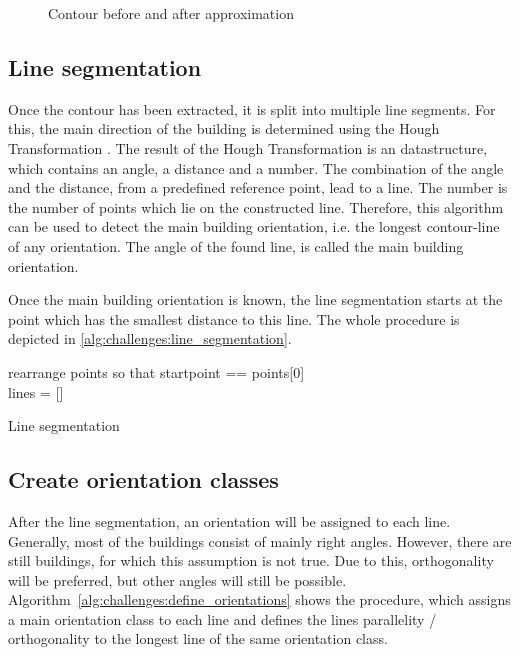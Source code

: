 \begin{figure}[H]
\begin{subfigure}{0.4\textwidth}
	\end{subfigure}
	\caption{Contour before and after approximation}
	\label{fig:challenges:contour_approximation}
\end{figure}


\subsection{Line segmentation}
Once the contour has been extracted, it is split into multiple line segments. For this, the main direction of the building is determined using the Hough Transformation \cite{Duda.1972}. The result of the Hough Transformation is an datastructure, which contains an angle, a distance and a number. The combination of the angle and the distance, from a predefined reference point, lead to a line. The number is the number of points which lie on the constructed line. Therefore, this algorithm can be used to detect the main building orientation, i.e. the longest contour-line of any orientation. The angle of the found line, is called the main building orientation.

Once the main building orientation is known, the line segmentation starts at the point which has the smallest distance to this line. The whole procedure is depicted in \autoref{alg:challenges:line_segmentation}.

\begin{algorithm}[H]
rearrange points so that startpoint == points[0]\\
lines = []\\
\caption{Line segmentation}
\label{alg:challenges:line_segmentation}
\end{algorithm}

\subsection{Create orientation classes}
After the line segmentation, an orientation will be assigned to each line. Generally, most of the buildings consist of mainly right angles. However, there are still buildings, for which this assumption is not true. Due to this, orthogonality will be preferred, but other angles will still be possible. Algorithm~\ref{alg:challenges:define_orientations} shows the procedure, which assigns a main orientation class to each line and defines the lines parallelity / orthogonality to the longest line of the same orientation class.

